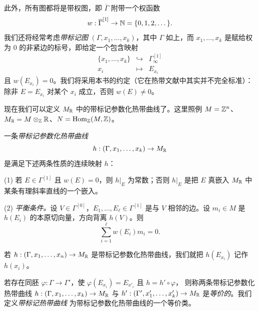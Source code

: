 此外，所有图都将是带权图，即 $\overline\Gamma$ 附带一个权函数
\[
  w:\overline\Gamma^{[1]}\to\mathbb{N}=\{0,1,2,\dots\}.
\]
我们还将经常考虑\emph{带标记图} $(\Gamma,x_1,\dots,x_k)$，其中 $\Gamma$ 如上，而
$x_1,\dots,x_k$ 是赋给权为 $0$ 的非紧边的标号，即给定一个包含映射
\[
  \begin{array}{rcl}
    \{x_1,\dots,x_k\} & \hookrightarrow & \Gamma^{[1]}_\infty\\
    x_i & \mapsto & E_{x_i}
  \end{array}
\]
且 $w(E_{x_i})=0$。我们将采用本书的约定（它在热带文献中其实并不完全标准）：
除非 $E=E_{x_i}$ 对某个 $x_i$ 成立，否则 $w(E)\neq 0$。

现在我们可以定义 $M_{\mathbb{R}}$ 中的带标记参数化热带曲线了。这里照例 $M=\mathbb{Z}^n$、
$M_{\mathbb{R}}=M\otimes_{\mathbb{Z}}\mathbb{R}$、$N=\operatorname{Hom}_{\mathbb{Z}}(M,\mathbb{Z})$。

\begin{definition}
一条\emph{带标记参数化热带曲线}
\[
  h:(\Gamma,x_1,\dots,x_k)\to M_{\mathbb{R}}
\]
是满足下述两条性质的连续映射 $h$：

(1) 若 $E\in\Gamma^{[1]}$ 且 $w(E)=0$，则 $h|_E$ 为常数；否则 $h|_E$ 是把 $E$ 真嵌入
$M_{\mathbb{R}}$ 中某条有理斜率直线的一个嵌入。

(2) \emph{平衡条件。}设 $V\in\Gamma^{[0]}$，$E_1,\dots,E_\ell\in\Gamma^{[1]}$ 是与 $V$
相邻的边。设 $m_i\in M$ 是 $h(E_i)$ 的本原切向量，方向背离 $h(V)$。则
\[
  \sum_{i=1}^{\ell}w(E_i)m_i=0 .
\]
\end{definition}

若 $h:(\Gamma,x_1,\dots,x_n)\to M_{\mathbb{R}}$ 是带标记参数化热带曲线，我们就把 $h(E_{x_i})$ 记作
$h(x_i)$。


若存在同胚 $\varphi:\Gamma\to\Gamma'$，使 $\varphi(E_{x_i})=E_{x'_i}$ 且 $h=h'\circ\varphi$，
则称两条带标记参数化热带曲线 $h:(\Gamma,x_1,\dots,x_k)\to M_{\mathbb{R}}$ 与
$h':(\Gamma',x'_1,\dots,x'_k)\to M_{\mathbb{R}}$ 是\emph{等价的}。我们定义\emph{带标记热带曲线}
为带标记参数化热带曲线的一个等价类。

